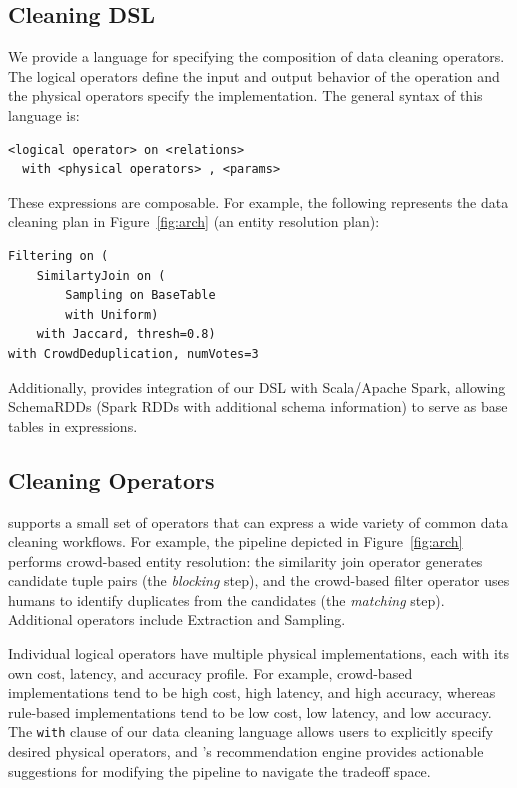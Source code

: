\subsection{Cleaning DSL}
\label{sec:dsl}
We provide a language for specifying the composition of data cleaning operators.
The logical operators define the input and output behavior of the operation and 
the physical operators specify the implementation.
The general syntax of this language is:
\begin{lstlisting}
<logical operator> on <relations>
  with <physical operators> , <params>
\end{lstlisting}

These expressions are composable. For example, the following represents the data cleaning plan in Figure~\ref{fig:arch} (an entity resolution plan):
\begin{lstlisting} 
Filtering on (
    SimilartyJoin on (
        Sampling on BaseTable
        with Uniform)
    with Jaccard, thresh=0.8) 
with CrowdDeduplication, numVotes=3
\end{lstlisting}
Additionally, \sys provides integration of our DSL with Scala/Apache Spark, allowing SchemaRDDs (Spark RDDs with additional schema information) to serve as base tables in expressions.

\subsection{Cleaning Operators}
\label{sec:operators}
\sys supports a small set of operators that can express a wide variety of common data cleaning workflows. 
For example, the pipeline depicted in Figure~\ref{fig:arch} performs crowd-based entity resolution: the similarity join operator generates candidate tuple pairs (the \textit{blocking} step), and the crowd-based filter operator uses humans to identify duplicates from the candidates (the \textit{matching} step). 
Additional operators include Extraction and Sampling.

Individual logical operators have multiple physical implementations, each with its own cost, latency, and accuracy profile. 
For example, crowd-based implementations tend to be high cost, high latency, and high accuracy, whereas rule-based implementations tend to be low cost, low latency, and low accuracy. 
The \texttt{with} clause of our data cleaning language allows users to explicitly specify desired physical operators, and \sys's recommendation engine provides actionable suggestions for modifying the pipeline to navigate the tradeoff space.





